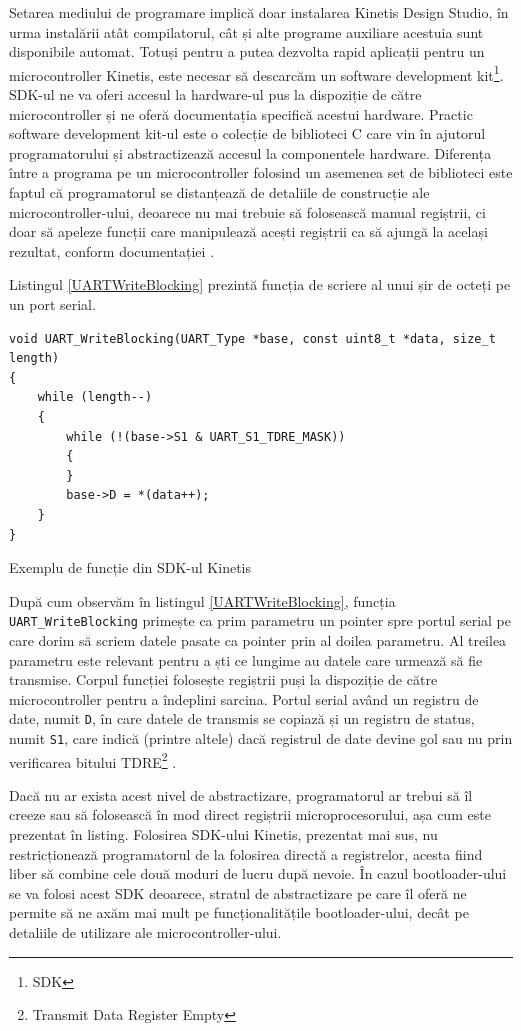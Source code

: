 \documentclass[12pt,a4paper,titlepage]{report}
\begin{document}
Setarea mediului de programare implică doar instalarea Kinetis Design Studio, în urma instalării atât compilatorul, cât și alte programe auxiliare acestuia sunt disponibile automat. Totuși pentru a putea dezvolta rapid aplicații pentru un microcontroller Kinetis, este necesar să descarcăm un software development kit\footnote{SDK}. SDK-ul ne va oferi accesul la hardware-ul pus la dispoziție de către microcontroller și ne oferă documentația specifică acestui hardware. Practic software development kit-ul este o colecție de biblioteci C care vin în ajutorul programatorului și abstractizează accesul la componentele hardware. Diferența între a programa pe un microcontroller folosind un asemenea set de biblioteci este faptul că programatorul se distanțează de detaliile de construcție ale microcontroller-ului, deoarece nu mai trebuie să folosească manual regiștrii, ci doar să apeleze funcții care manipulează acești regiștrii ca să ajungă la același rezultat, conform documentației \cite{ksdk}.

Listingul \ref{UARTWriteBlocking} prezintă funcția de scriere al unui șir de octeți pe un port serial.

\begin{listing}[h]
\begin{verbatim}
void UART_WriteBlocking(UART_Type *base, const uint8_t *data, size_t length)
{
    while (length--)
    {
        while (!(base->S1 & UART_S1_TDRE_MASK))
        {
        }
        base->D = *(data++);
    }
}
\end{verbatim}

\caption{Exemplu de funcție din SDK-ul Kinetis}
\label{UARTWriteBlocking}
\end{listing}

După cum observăm în listingul \ref{UARTWriteBlocking}, funcția \texttt{UART\_WriteBlocking} primește ca prim parametru un pointer spre portul serial pe care dorim să scriem datele pasate ca pointer prin al doilea parametru. Al treilea parametru este relevant pentru a ști ce lungime au datele care urmează să fie transmise. Corpul funcției folosește regiștrii puși la dispoziție de către microcontroller pentru a îndeplini sarcina. Portul serial având un registru de date, numit \texttt{D}, în care datele de transmis se copiază și un registru de status, numit \texttt{S1}, care indică (printre altele) dacă registrul de date devine gol sau nu prin verificarea bitului TDRE\footnote{Transmit Data Register Empty} \cite{kv5x}.

Dacă nu ar exista acest nivel de abstractizare, programatorul ar trebui să îl creeze sau să folosească în mod direct regiștrii microprocesorului, așa cum este prezentat în listing. Folosirea SDK-ului Kinetis, prezentat mai sus, nu restricționează programatorul de la folosirea directă a registrelor, acesta fiind liber să combine cele două moduri de lucru după nevoie. În cazul bootloader-ului se va folosi acest SDK deoarece, stratul de abstractizare pe care îl oferă ne permite să ne axăm mai mult pe funcționalitățile bootloader-ului, decât pe detaliile de utilizare ale microcontroller-ului.
\end{document}
